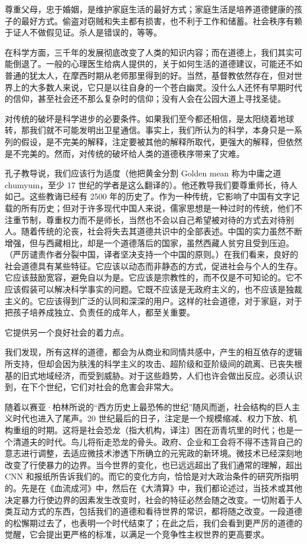 尊重父母，忠于婚姻，是维护家庭生活的最好方式；家庭生活是培养道德健康的孩子的最好方式。偷盗对窃贼和失主都有损害，也不利于工作和储蓄。社会秩序有赖于证人不做假见证。杀人是错误的，等等。

在科学方面，三千年的发展彻底改变了人类的知识内容；而在道德上，我们其实可能倒退了。一般的心理医生给病人提供的，关于如何生活的道德建议，可能还不如普通的犹太人，在摩西时期从老师那里得到的好。当然，基督教依然存在，但对世界上的大多数人来说，它只是以往自身的一个苍白幽灵。没什么人还怀有早期时代的信仰，甚至社会还不那么复杂时的信仰；没有人会在公园大道上寻找圣徒。

对传统的破坏是科学进步的必要条件。如果我们至今都还相信，是太阳绕着地球转，那我们就不可能发明出卫星通信。事实上，我们所认为的科学，本身只是一系列的假设，是不完美的解释，注定要被其他的解释所取代，更强大的解释，但依然是不完美的。然而，对传统的破坏给人类的道德秩序带来了灾难。

孔子教导说，我们应该行为适度（他把黄金分割 Golden mean 称为中庸之道 chumyum，至少 17 世纪的学者是这么翻译的）。他还教导我们要尊重师长，待人如己。这些教诲已经有 2500 年的历史了。作为一种传统，它影响了中国有文字记载的所有历史；但对于许多现代中国人来说，儒家思想是一种过时的传统，他们不注重节制，尊重权力而不是师长，当然也不会以自己希望被对待的方式去对待别人。随着传统的沦丧，社会将失去其道德共识中的全部表述。中国的实力虽然不断增强，但与西藏相比，却是一个道德落后的国家，虽然西藏人贫穷且受到压迫。（严厉谴责作者分裂中国，译者坚决支持一个中国的原则。）在我们看来，良好的社会道德具有某些特征。它应该以动态而非静态的方式，促进社会与个人的生存。它应该鼓励宽容，避免自以为是。它应该是宗教性的，而不仅是不可知论的。它不应该假装可以解决科学事实的问题。它既不应该是无政府主义的，也不应该是独裁主义的。它应该得到广泛的认同和深深的用户。这样的社会道德，对于家庭，对于把孩子培养成独立、负责任的成年人，都至关重要。

它提供另一个良好社会的着力点。

我们发现，所有这样的道德，都会为从商业和同情共感中，产生的相互依存的逻辑所支持，但却会因为肤浅的科学主义的攻击、超阶级和亚阶级间的疏离、已丧失根基的旧式地域经济，而受到威胁。对于这些趋势，人们也许会做出反应。必须认识到，在下个世纪，它们对社会的危害会非常大。

随着以赛亚·柏林所说的“西方历史上最恐怖的世纪”随风而逝，社会结构的巨人主义时代也进入了尾声。20 世纪最后的日子，注定是一个规模缩减、权力下放、机构重组的时期。这将是社会恐龙（指大机构，译注）困在沥青坑里的时代；也是一个清道夫的时代。鸟儿将衔走恐龙的骨头。政府、企业和工会将不得不违背自己的意志进行调整，去适应微技术渗透下所确立的元宪政的新环境。微技术已经深刻地改变了行使暴力的边界。当今世界的变化，也已远远超出了我们通常的理解，超出 CNN 和报纸所告诉我们的。而它的变化方向，恰恰是对大政治条件的研究所指明的。先是在《血流成河》中，然后在《大清算》中，我们都论述过，当技术或其他决定暴力行使边界的因素发生改变时，社会的特征必然会随之改变。一切附着于人类互动方式的东西，包括我们的道德和看待世界的常识，都将随之改变。一段道德的松懈期过去了，也表明一个时代结束了；在此之后，我们会看到更严厉的道德的觉醒，它会提出更严格的标准，以满足一个竞争性主权世界的更高要求。

